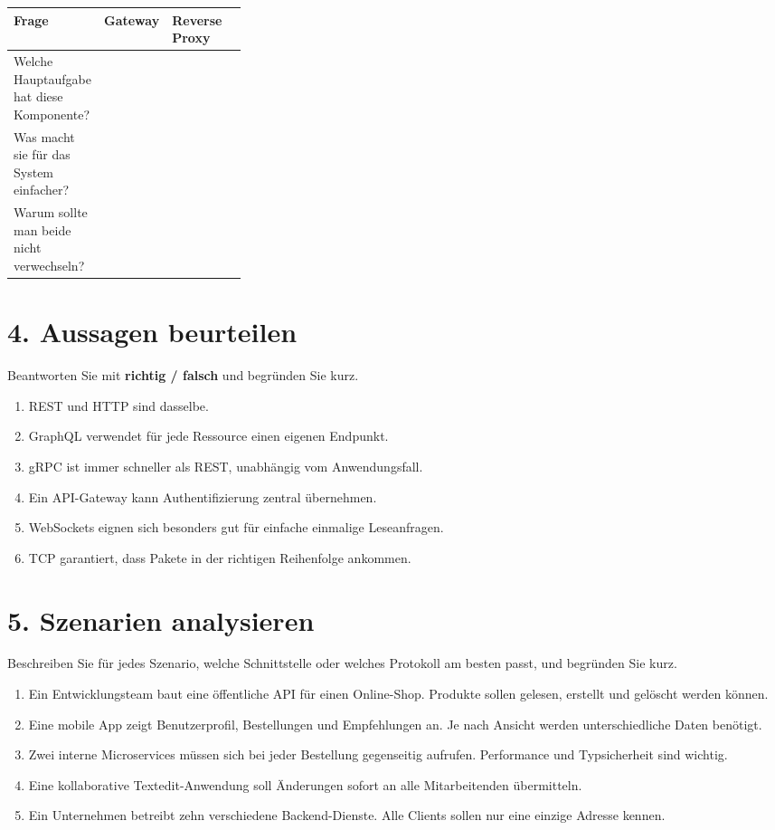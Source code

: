 \documentclass[11pt,a4paper]{article}
\begin{document}
\vspace{1em}

\begin{tabularx}{\linewidth}{|>{\raggedright\arraybackslash}p{0.30\linewidth}|>{\raggedright\arraybackslash}X|>{\raggedright\arraybackslash}X|}
\hline
\textbf{Frage} & \textbf{Gateway} & \textbf{Reverse Proxy} \\
\hline
Welche Hauptaufgabe hat diese Komponente? & & \\[1.1cm] \hline
Was macht sie für das System einfacher? & & \\[1.1cm] \hline
Warum sollte man beide nicht verwechseln? & & \\[1.1cm] \hline
\end{tabularx}

\section*{4. Aussagen beurteilen}
Beantworten Sie mit \textbf{richtig / falsch} und begründen Sie kurz.

\begin{enumerate}
  \item REST und HTTP sind dasselbe.
  \item GraphQL verwendet für jede Ressource einen eigenen Endpunkt.
  \item gRPC ist immer schneller als REST, unabhängig vom Anwendungsfall.
  \item Ein API-Gateway kann Authentifizierung zentral übernehmen.
  \item WebSockets eignen sich besonders gut für einfache einmalige Leseanfragen.
  \item TCP garantiert, dass Pakete in der richtigen Reihenfolge ankommen.
\end{enumerate}

\section*{5. Szenarien analysieren}
Beschreiben Sie für jedes Szenario, welche Schnittstelle oder welches Protokoll am besten passt, und begründen Sie kurz.

\begin{enumerate}
  \item Ein Entwicklungsteam baut eine öffentliche API für einen Online-Shop. Produkte sollen gelesen, erstellt und gelöscht werden können.
  \item Eine mobile App zeigt Benutzerprofil, Bestellungen und Empfehlungen an. Je nach Ansicht werden unterschiedliche Daten benötigt.
  \item Zwei interne Microservices müssen sich bei jeder Bestellung gegenseitig aufrufen. Performance und Typsicherheit sind wichtig.
  \item Eine kollaborative Textedit-Anwendung soll Änderungen sofort an alle Mitarbeitenden übermitteln.
  \item Ein Unternehmen betreibt zehn verschiedene Backend-Dienste. Alle Clients sollen nur eine einzige Adresse kennen.
\end{enumerate}
\end{document}
